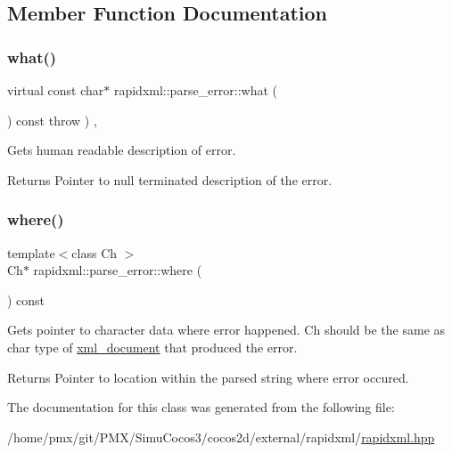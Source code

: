 \subsection{Member Function Documentation}
\mbox{\label{classrapidxml_1_1parse__error_a986003116ebcb49a69a20228da306232}} 
\subsubsection{\texorpdfstring{what()}{what()}}
{\footnotesize\ttfamily virtual const char$\ast$ rapidxml\+::parse\+\_\+error\+::what (\begin{DoxyParamCaption}{ }\end{DoxyParamCaption}) const throw  ) \hspace{0.3cm}{\ttfamily [inline]}, {\ttfamily [virtual]}}

Gets human readable description of error. \begin{DoxyReturn}{Returns}
Pointer to null terminated description of the error. 
\end{DoxyReturn}
\mbox{\label{classrapidxml_1_1parse__error_ab139528f4d9e960f0ee807d22d6c032d}} 
\subsubsection{\texorpdfstring{where()}{where()}}
{\footnotesize\ttfamily template$<$class Ch $>$ \\
Ch$\ast$ rapidxml\+::parse\+\_\+error\+::where (\begin{DoxyParamCaption}{ }\end{DoxyParamCaption}) const\hspace{0.3cm}{\ttfamily [inline]}}

Gets pointer to character data where error happened. Ch should be the same as char type of \hyperlink{classrapidxml_1_1xml__document}{xml\+\_\+document} that produced the error. \begin{DoxyReturn}{Returns}
Pointer to location within the parsed string where error occured. 
\end{DoxyReturn}


The documentation for this class was generated from the following file\+:\begin{DoxyCompactItemize}
\item 
/home/pmx/git/\+P\+M\+X/\+Simu\+Cocos3/cocos2d/external/rapidxml/\hyperlink{rapidxml_8hpp}{rapidxml.\+hpp}\end{DoxyCompactItemize}
